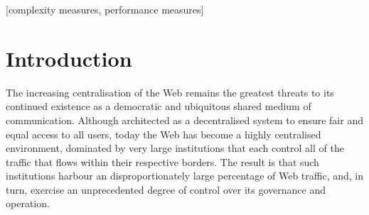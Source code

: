 \documentclass{acm_proc_article-sp}
\begin{document}
{%

\maketitle
\begin{abstract}

\end{abstract}

[complexity measures, performance measures]



\section{Introduction}

The increasing centralisation of the Web remains the greatest threats to its continued existence as a democratic and ubiquitous shared medium of communication. Although architected as a decentralised system to ensure fair and equal access to all users, today the Web has become a highly centralised environment, dominated by very large institutions that each control all of the traffic that flows within their respective borders.  The result is that such institutions harbour an disproportionately large percentage of Web traffic, and, in turn, exercise an unprecedented degree of control over its governance and operation.

}
\end{document}
